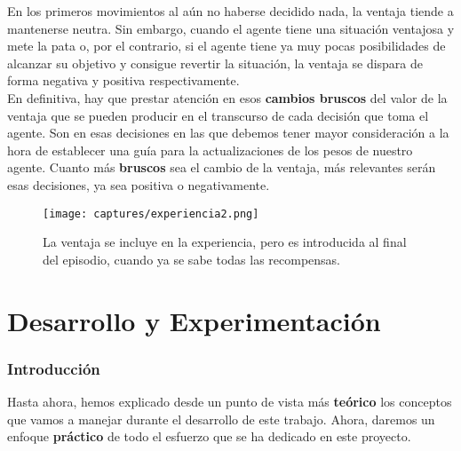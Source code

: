 \documentclass[11pt,fleqn]{book} %
\begin{document}
En los primeros movimientos al aún no haberse decidido nada, la ventaja tiende a mantenerse neutra. Sin embargo, cuando el agente tiene una situación ventajosa y mete la pata o, por el contrario, si el agente tiene ya muy pocas posibilidades de alcanzar su objetivo y consigue revertir la situación, la ventaja se dispara de forma negativa y positiva respectivamente. \\

En definitiva, hay que prestar atención en esos \textbf{cambios bruscos} del valor de la ventaja que se pueden producir en el transcurso de cada decisión que toma el agente. Son en esas decisiones en las que debemos tener mayor consideración a la hora de establecer una guía para la actualizaciones de los pesos de nuestro agente. Cuanto más \textbf{bruscos} sea el cambio de la ventaja, más relevantes serán esas decisiones, ya sea positiva o negativamente.

\begin{figure}[H]
	\centering\texttt{[image: captures/experiencia2.png]}
	\caption{La ventaja se incluye en la experiencia, pero es introducida al final del episodio, cuando ya se sabe todas las recompensas.}
	\label{fig:experiencia2} %
\end{figure}



\part{Desarrollo y Experimentación}

\section*{Introducción}\label{sec:introduccionexp}

Hasta ahora, hemos explicado desde un punto de vista más \textbf{teórico} los conceptos que vamos a manejar durante el desarrollo de este trabajo. Ahora, daremos un enfoque \textbf{práctico} de todo el esfuerzo que se ha dedicado en este proyecto. \\
\end{document}
